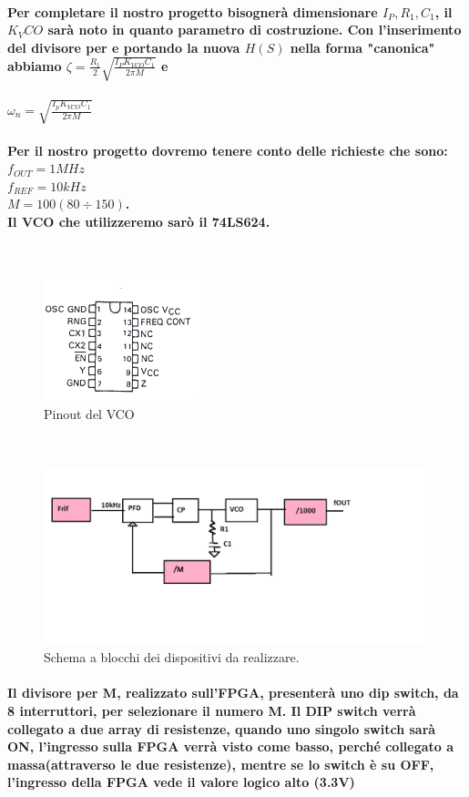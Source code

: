 \documentclass{article}
\begin{document}
\paragraph{Per completare il nostro progetto bisognerà dimensionare $I_P,R_1,C_1$, il $K_VCO$ sarà noto in quanto parametro di costruzione.
Con l'inserimento del divisore per e portando la nuova $H(S)$ nella forma "canonica" abbiamo $\zeta=\frac{R_1}{2}\sqrt{\frac{I_P K_{VCO}C_1}{2\pi M}}$ e }

$\omega _n= \sqrt  {   \frac{I_pK_{VCO}C_1}{2\pi M}   }$ 

\paragraph{Per il nostro progetto dovremo tenere conto delle richieste che sono:$f_{OUT}=1 MHz$\\$f_{REF}=10 kHz$\\$M=100 (80\div150)$.\\Il VCO che utilizzeremo sarò il 74LS624.}
~\begin{figure}[!h]%
\includegraphics[scale=1]{74LS.png} 
\centering
\caption{Pinout del VCO}
\label{fig:foo}
\end{figure}
~\begin{figure}[!h]%
\includegraphics[scale=0.4]{SCH.png} 
\centering
\caption{Schema a blocchi dei dispositivi da realizzare.}
\label{fig:foo}
\end{figure}
\paragraph{Il divisore per M, realizzato sull'FPGA, presenterà uno dip switch, da 8 interruttori, per selezionare il numero M. Il DIP switch verrà collegato a due array di resistenze, quando uno singolo switch sarà ON, l'ingresso sulla FPGA verrà visto come basso, perché collegato a massa(attraverso le due resistenze), mentre se lo switch è su OFF, l'ingresso della FPGA vede il valore logico alto (3.3V)}
\newpage
\end{document}
